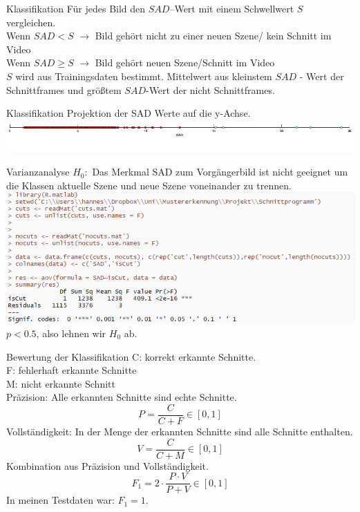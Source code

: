 \documentclass[11pt]{beamer}
\begin{document}
\begin{frame}{Klassifikation}
Für jedes Bild den $SAD$--Wert mit einem Schwellwert $S$ vergleichen.\\
Wenn $SAD < S$ $\rightarrow$ Bild gehört nicht zu einer neuen Szene/ kein Schnitt im Video\\  
Wenn $SAD \geq S$ $\rightarrow$ Bild gehört  neuen Szene/Schnitt im Video\\  
$S$ wird aus Trainingsdaten bestimmt. Mittelwert aus kleinstem $SAD$ - Wert der Schnittframes und größtem $SAD$-Wert der nicht Schnittframes.
\end{frame}

\begin{frame}{Klassifikation}
Projektion der SAD Werte auf die y-Achse.
\includegraphics[scale=0.5]{SADProjektion.png}
\end{frame}

\begin{frame}{Varianzanalyse}
$H_0:$ Das Merkmal SAD zum Vorgängerbild ist nicht geeignet um die Klassen \glqq aktuelle Szene\grqq{} und \glqq neue Szene\grqq{} voneinander zu trennen. \\
\includegraphics[scale=0.44]{statistik.png}\\
$p < 0.5$, also lehnen wir $H_0$ ab.
\end{frame}

\begin{frame}{Bewertung der Klassifikation}
C: korrekt erkannte Schnitte.\\
F: fehlerhaft erkannte Schnitte\\
M: nicht erkannte Schnitt\\
Präzision: Alle erkannten Schnitte sind echte Schnitte.
\[ P = \frac{C}{C+F} \in [0,1] \] 
Vollständigkeit: In der Menge der erkannten Schnitte sind alle Schnitte enthalten.
\[ V = \frac{C}{C+M} \in [0,1] \]
Kombination aus Präzision und Vollständigkeit.
\[ F_1 = 2 \cdot \frac{P\cdot V}{P + V} \in [0,1] \]
In meinen Testdaten war: $F_1 = 1$. 

\end{frame}
\end{document}
